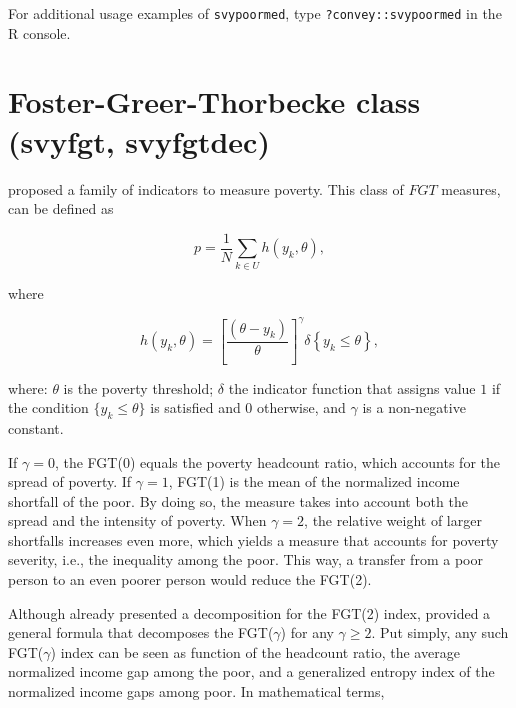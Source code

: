\documentclass[
]{book}
\newenvironment{Shaded}{\begin{snugshade}}{\end{snugshade}}
\newcommand{\CommentTok}[1]{\textcolor[rgb]{0.56,0.35,0.01}{\textit{#1}}}
\newcommand{\DecValTok}[1]{\textcolor[rgb]{0.00,0.00,0.81}{#1}}
\newcommand{\FunctionTok}[1]{\textcolor[rgb]{0.13,0.29,0.53}{\textbf{#1}}}
\newcommand{\NormalTok}[1]{#1}
\newcommand{\SpecialCharTok}[1]{\textcolor[rgb]{0.81,0.36,0.00}{\textbf{#1}}}
\begin{document}
\begin{Shaded}
\end{Shaded}

For additional usage examples of \texttt{svypoormed}, type \texttt{?convey::svypoormed} in the R console.

\hypertarget{foster-greer-thorbecke-class-svyfgt-svyfgtdec}{%
\section{Foster-Greer-Thorbecke class (svyfgt, svyfgtdec)}\label{foster-greer-thorbecke-class-svyfgt-svyfgtdec}}

\textcite{foster1984} proposed a family of indicators to measure poverty. This class of \(FGT\) measures, can be defined as

\[
p=\frac{1}{N}\sum_{k\in U}h(y_{k},\theta ), 
\]

where

\[
h(y_{k},\theta )=\left[ \frac{(\theta -y_{k})}{\theta }\right] ^{\gamma
}\delta \left\{ y_{k}\leq \theta \right\} , 
\]

where: \(\theta\) is the poverty threshold; \(\delta\) the indicator function that assigns value \(1\) if the condition \(\{y_{k}\leq \theta \}\) is satisfied and \(0\) otherwise, and \(\gamma\) is a non-negative constant.

If \(\gamma =0\), the FGT(0) equals the poverty headcount ratio, which accounts for the spread of poverty. If \(\gamma =1\), FGT(1) is the mean of the normalized income shortfall of the poor. By doing so, the measure takes into account both the spread and the intensity of poverty. When \(\gamma =2\), the relative weight of larger shortfalls increases even more, which yields a measure that accounts for poverty severity, i.e., the inequality among the poor. This way, a transfer from a poor person to an even poorer person would reduce the FGT(2).

Although \textcite{foster1984} already presented a decomposition for the FGT(2) index, \textcite{aristondo2010} provided a general formula that decomposes the FGT(\(\gamma\)) for any \(\gamma \geqslant 2\). Put simply, any such FGT(\(\gamma\)) index can be seen as function of the headcount ratio, the average normalized income gap among the poor, and a generalized entropy index of the normalized income gaps among poor. In mathematical terms,
\end{document}
